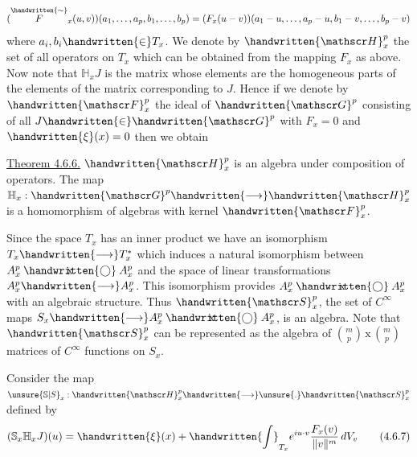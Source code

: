 \[
(\overset{\handwritten{\sim}}{F}_x(u,v))(a_1,\ldots,a_p,b_1,\ldots,b_p)=(F_x(u-v))(a_1-u,\ldots,a_p-u,b_1-v,\ldots,b_p-v)
\]
where $a_i,b_i\handwritten{\in}T_x$. We denote by $\handwritten{\mathscr H}_x^p$ the set of all operators on $T_x$ which can be obtained from the mapping $F_x$ as above. Now note that $\mathbb H_x J$ is the matrix whose elements are the homogeneous parts of the elements of the matrix corresponding to $J$. Hence if we denote by $\handwritten{\mathscr F}_x^p$ the ideal of $\handwritten{\mathscr G}^p$ consisting of all $J\handwritten{\in}\handwritten{\mathscr G}^p$ with $F_x=0$ and $\handwritten{\xi}(x)=0$ then we obtain

\uline{Theorem 4.6.6.} $\handwritten{\mathscr H}_x^p$ is an algebra under composition of operators. The map $\mathbb H_x:\handwritten{\mathscr G}^p\handwritten{\longrightarrow}\handwritten{\mathscr H}_x^p$ is a homomorphism of algebras with kernel $\handwritten{\mathscr F}_x^p$.

Since the space $T_x$ has an inner product we have an isomorphism $T_x\handwritten{\longrightarrow}T_x^*$ which induces a natural isomorphism between $A_x^p\mathbin{\ooalign{\hfil$\mathrm{x}$\hfil\cr\hfil$\handwritten{\bigcirc}$\hfil\cr}}A_x^p$ and the space of linear transformations $A_x^p\handwritten{\longrightarrow}A_x^p$. This isomorphism provides $A_x^p\mathbin{\ooalign{\hfil$\mathrm{x}$\hfil\cr\hfil$\handwritten{\bigcirc}$\hfil\cr}}A_x^p$ with an algebraic structure. Thus $\handwritten{\mathscr S}_x^p$, the set of $C^\infty$ maps $S_x\handwritten{\longrightarrow}A_x^p\mathbin{\ooalign{\hfil$\mathrm{x}$\hfil\cr\hfil$\handwritten{\bigcirc}$\hfil\cr}}A_x^p$, is an algebra. Note that $\handwritten{\mathscr S}_x^p$ can be represented as the algebra of $\binom mp\,\mathrm{x}\,\binom mp$ matrices of $C^\infty$ functions on $S_x$.

Consider the map $\unsure{\mathbb S|S}_x:\handwritten{\mathscr H}_x^p\handwritten{\longrightarrow}\unsure{.}\handwritten{\mathscr S}_x^p$ defined by
\[
(\mathbb S_x\mathbb H_x J)(u)=\handwritten{\xi}(x)+\handwritten{\int}_{T_x} e^{iu\cdot v}\frac{F_x(v)}{\lVert v\rVert^m}\,dV_v
\tag*{(4.6.7)}
\]
